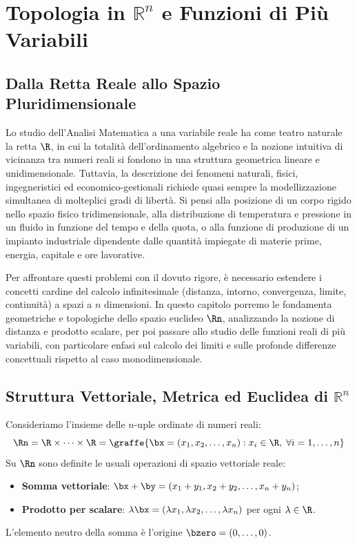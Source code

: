 
\chapter{Topologia in \texorpdfstring{$\mathbb{R}^n$}{R\textasciicircum n} e Funzioni di Più Variabili}
\label{chap:topologia_funzioni_multivariabile}

\section{Dalla Retta Reale allo Spazio Pluridimensionale}

Lo studio dell'Analisi Matematica a una variabile reale ha come teatro naturale la retta $\R$, in cui la totalità dell'ordinamento algebrico e la nozione intuitiva di vicinanza tra numeri reali si fondono in una struttura geometrica lineare e unidimensionale. Tuttavia, la descrizione dei fenomeni naturali, fisici, ingegneristici ed economico-gestionali richiede quasi sempre la modellizzazione simultanea di molteplici gradi di libertà. Si pensi alla posizione di un corpo rigido nello spazio fisico tridimensionale, alla distribuzione di temperatura e pressione in un fluido in funzione del tempo e della quota, o alla funzione di produzione di un impianto industriale dipendente dalle quantità impiegate di materie prime, energia, capitale e ore lavorative.

Per affrontare questi problemi con il dovuto rigore, è necessario estendere i concetti cardine del calcolo infinitesimale (distanza, intorno, convergenza, limite, continuità) a spazi a $n$ dimensioni. In questo capitolo porremo le fondamenta geometriche e topologiche dello spazio euclideo $\Rn$, analizzando la nozione di distanza e prodotto scalare, per poi passare allo studio delle funzioni reali di più variabili, con particolare enfasi sul calcolo dei limiti e sulle profonde differenze concettuali rispetto al caso monodimensionale.

\section{Struttura Vettoriale, Metrica ed Euclidea di \texorpdfstring{$\mathbb{R}^n$}{R\textasciicircum n}}

Consideriamo l'insieme delle $n$-uple ordinate di numeri reali:
\[
\Rn = \R \times \dots \times \R = \graffe{\bx = (x_1, x_2, \dots, x_n) : x_i \in \R, \; \forall i=1,\dots,n}
\]
Su $\Rn$ sono definite le usuali operazioni di spazio vettoriale reale:
\begin{itemize}
    \item \textbf{Somma vettoriale}: $\bx + \by = (x_1 + y_1, x_2 + y_2, \dots, x_n + y_n)$;
    \item \textbf{Prodotto per scalare}: $\lambda \bx = (\lambda x_1, \lambda x_2, \dots, \lambda x_n)$ per ogni $\lambda \in \R$.
\end{itemize}
L'elemento neutro della somma è l'origine $\bzero = (0, \dots, 0)$.

